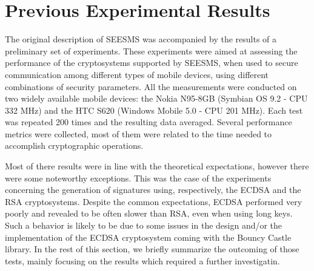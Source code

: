 \documentclass[authoryear]{elsarticle}
\begin{document}
\section{Previous Experimental Results}
\label{sec:experimental results}

The original description of SEESMS was accompanied by the results of a preliminary set of experiments. These experiments were aimed at assessing the performance of the cryptosystems supported by SEESMS, when used to secure communication among different types of mobile devices, using different combinations of security parameters. All the measurements were conducted on two widely available mobile devices: the Nokia N95-8GB (Symbian OS 9.2 - CPU 332 MHz) and the HTC S620 (Windows Mobile 5.0 - CPU 201 MHz). Each test was repeated 200 times and the resulting data averaged. Several performance metrics were collected, most of them were related to the time needed to accomplish cryptographic operations.



Most of there results were in line with the theoretical expectations, however there were some noteworthy exceptions. This was the case of the experiments concerning the generation of signatures using, respectively, the ECDSA and the RSA cryptosystems. Despite the common expectations, ECDSA performed very poorly  and revealed to be often slower than RSA, even when using long keys. Such a behavior is likely to be due to some issues in the design and/or the implementation of the ECDSA cryptosystem coming with the Bouncy Castle library. In the rest of this section, we briefly summarize the outcoming of those tests, mainly focusing on the results which required a further investigatin.




%
\end{document}
